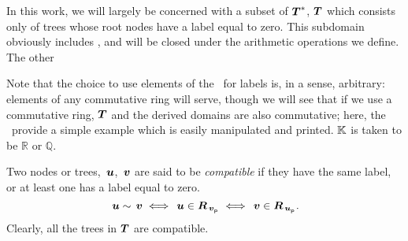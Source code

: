 In this work, we will largely be concerned with a subset of
$\boldsymbol{T}^*$, $\boldsymbol{T}$ which consists only of trees whose root nodes have
a label equal to zero. This subdomain obviously includes \tzerotree,
and will be closed under the arithmetic operations we define. The
other




Note that the choice to use elements of the \polytypes\ for labels is, in a
sense, arbitrary: elements of any commutative ring will serve, though
we will see that if we use a commutative ring, $\boldsymbol{T}$ and the derived
domains are also commutative; here, the \polytypes\ provide a
simple example which is easily manipulated and printed. 
$\mathbb{K}$ is taken to be $\mathbb{R}$ or $\mathbb{Q}$.

\begin{definition}\label{compatibility}
Two nodes or trees, $\,\boldsymbol{u}$, $\,\boldsymbol{v}$ are said to be
\emph{compatible\/} if they have the same label, or at least one has
a label equal to zero.
\[
  \,\boldsymbol{u} \sim \,\boldsymbol{v} \iff  
  \,\boldsymbol{u}\in\boldsymbol{R}_{{\,\boldsymbol{v}}_{{}_{\mathsf{P}}}} \iff 
  \,\boldsymbol{v}\in\boldsymbol{R}_{{\,\boldsymbol{u}}_{{}_{\mathsf{P}}}}.
\]
Clearly, all the trees in $\boldsymbol{T}$ are compatible.
\end{definition}


